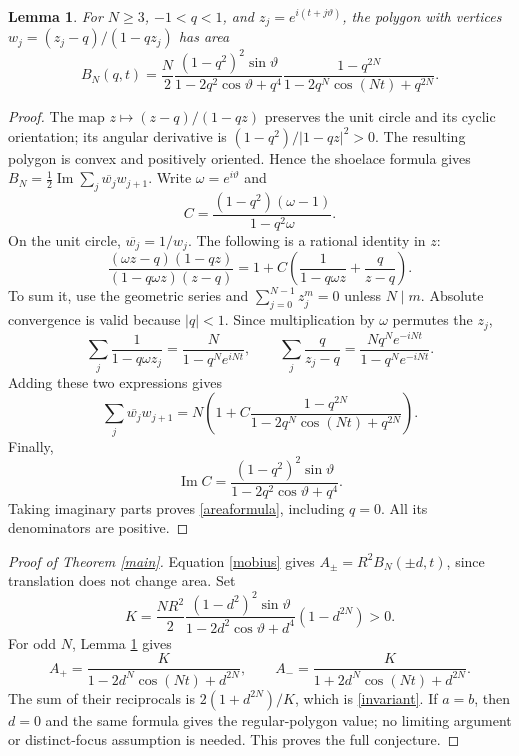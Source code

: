 \documentclass[11pt]{article}
\newtheorem{lemma}{Lemma}
\begin{document}
\begin{lemma}\label{area}
For $N\ge3$, $-1<q<1$, and $z_j=e^{i(t+j\vartheta)}$, the polygon with
vertices $w_j=(z_j-q)/(1-qz_j)$ has area
\begin{equation}\label{areaformula}
 B_N(q,t)=\frac{N}{2}\frac{(1-q^2)^2\sin\vartheta}
 {1-2q^2\cos\vartheta+q^4}
 \frac{1-q^{2N}}{1-2q^N\cos(Nt)+q^{2N}}.
\end{equation}
\end{lemma}
\begin{proof}
The map $z\mapsto(z-q)/(1-qz)$ preserves the unit circle and its cyclic
orientation; its angular derivative is $(1-q^2)/|1-qz|^2>0$.
The resulting polygon is convex and positively oriented. Hence the
shoelace formula gives $B_N=\frac12\operatorname{Im}\sum_j\overline{w_j}w_{j+1}$.
Write $\omega=e^{i\vartheta}$ and
\[
 C=\frac{(1-q^2)(\omega-1)}{1-q^2\omega}.
\]
On the unit circle, $\overline{w_j}=1/w_j$. The following is a rational
identity in $z$:
\begin{equation}\label{partial}
 \frac{(\omega z-q)(1-qz)}{(1-q\omega z)(z-q)}
 =1+C\left(\frac1{1-q\omega z}+\frac{q}{z-q}\right).
\end{equation}
To sum it, use the geometric series and
$\sum_{j=0}^{N-1}z_j^m=0$ unless $N\mid m$. Absolute convergence is
valid because $|q|<1$. Since multiplication by $\omega$ permutes the $z_j$,
\[
 \sum_j\frac1{1-q\omega z_j}=\frac{N}{1-q^Ne^{iNt}},\qquad
 \sum_j\frac{q}{z_j-q}=\frac{Nq^Ne^{-iNt}}{1-q^Ne^{-iNt}}.
\]
Adding these two expressions gives
\[
 \sum_j\overline{w_j}w_{j+1}
 =N\left(1+C\frac{1-q^{2N}}{1-2q^N\cos(Nt)+q^{2N}}\right).
\]
Finally,
\[
 \operatorname{Im}C=
 \frac{(1-q^2)^2\sin\vartheta}{1-2q^2\cos\vartheta+q^4}.
\]
Taking imaginary parts proves \eqref{areaformula}, including $q=0$.
All its denominators are positive.
\end{proof}

\begin{proof}[Proof of Theorem \ref{main}]
Equation \eqref{mobius} gives $A_\pm=R^2B_N(\pm d,t)$, since translation
does not change area. Set
\[
 K=\frac{NR^2}{2}\frac{(1-d^2)^2\sin\vartheta}
 {1-2d^2\cos\vartheta+d^4}(1-d^{2N})>0.
\]
For odd $N$, Lemma \ref{area} gives
\[
 A_+=\frac{K}{1-2d^N\cos(Nt)+d^{2N}},\qquad
 A_-=\frac{K}{1+2d^N\cos(Nt)+d^{2N}}.
\]
The sum of their reciprocals is $2(1+d^{2N})/K$, which is
\eqref{invariant}. If $a=b$, then $d=0$ and the same formula gives the
regular-polygon value; no limiting argument or distinct-focus assumption
is needed. This proves the full conjecture.
\end{proof}
\end{document}
